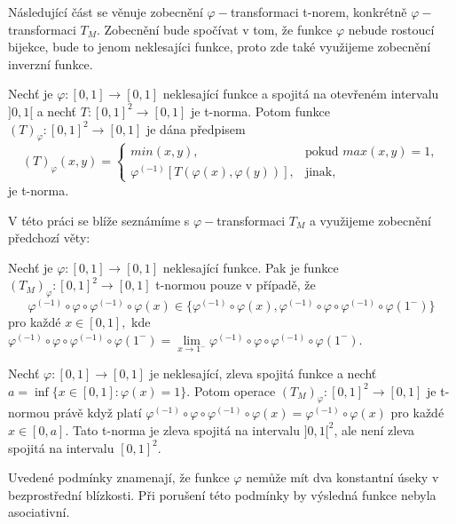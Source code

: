 Následující část se věnuje zobecn\v en\'i $\varphi-$transformaci t-norem, konkr\'etn\v e $\varphi-$transformaci $T_M.$ Zobecn\v en\'i bude spo\v c\'ivat v tom, \v ze funkce $\varphi$ nebude rostouc\'i bijekce, bude to jenom neklesaj\'ici funkce, proto zde tak\'e vyu\v zijeme zobecn\v en\'i inverzn\'i funkce. 
\begin{sentence}\cite{KMP}\label{subnorma}
     Nech\v t je $\varphi : [0,1] \rightarrow [0,1]$ neklesající funkce a  spojitá na otev\v ren\'em intervalu
 $]0,1[$ a nech\v t $T: [0,1]^2 \rightarrow [0,1]$ je t-norma. Potom funkce
    $(T)_\varphi : [0,1]^2 \rightarrow [0,1]$ je dána p\v redpisem $$(T)_\varphi (x,y)= \begin{cases} min(x,y), & \mbox {pokud } max(x,y) = 1,
    \\ \varphi^{(-1)}[T(\varphi(x), \varphi(y))], & \mbox {jinak,}
    \end{cases}$$
    je t-norma.
  \end{sentence}
  V této práci se blí\v ze seznámíme s $\varphi-$transformaci $T_M$ a využijeme zobecnění předchozí věty:

\begin{sentence} 
\cite{hlinena}
\label{smut} Nech\v t je $\varphi \colon [0,1] \to [0,1]$ neklesající funkce. Pak je funkce $(T_M)_\varphi\colon[0,1]^2\to[0,1]$  t-normou pouze v případě, že
$$\varphi^{(-1)}\circ\varphi\circ\varphi^{(-1)}\circ\varphi(x)\in \{\varphi^{(-1)}\circ\varphi(x),\varphi^{(-1)}\circ\varphi\circ\varphi^{(-1)}\circ\varphi(1^-)\}$$
pro každé $x\in[0,1],$ kde $\varphi^{(-1)}\circ\varphi\circ\varphi^{(-1)}\circ\varphi(1^-)=\lim\limits_{x\to 1^-}\varphi^{(-1)}\circ\varphi\circ\varphi^{(-1)}\circ\varphi(1^-).$
\end{sentence}
\begin{remark}
    Nech\v t $\varphi\colon[0,1]\to [0,1]$ je neklesající, zleva spojitá  funkce a nechť $a=\inf\{x \in [0,1]\colon \varphi(x)=1\}.$ Potom operace $(T_M)_\varphi\colon[0,1]^2\to[0,1]$ je t-normou právě když platí $\varphi^{(-1)}\circ\varphi\circ\varphi^{(-1)}\circ\varphi(x)=\varphi^{(-1)}\circ\varphi(x)$ pro každé $x \in [0,a].$ Tato  t-norma je zleva spojitá na intervalu  $]0,1[^2$, ale není zleva spojitá na  intervalu $[0,1]^2.$
\end{remark}

Uveden\'e podm\'inky znamenaj\'i, \v ze funkce $\varphi$ nem\r u\v ze m\'it dva konstantn\'i \'useky v bezprost\v redn\'i bl\'izkosti. P\v ri poru\v sen\'i t\'eto podm\'inky by v\'ysledn\'a funkce nebyla asociativn\'i.
\bigskip


